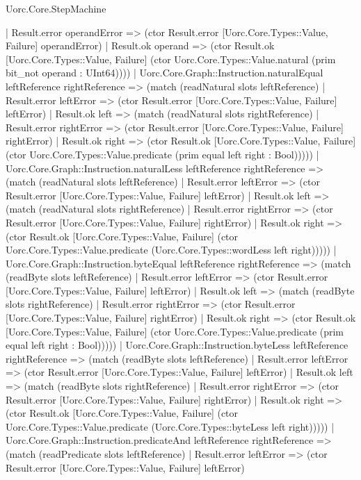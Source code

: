 \begin{lexlean}{Uorc.Core.StepMachine}
\begin{semanticmodule}
{      | Result.error operandError => (ctor Result.error [Uorc.Core.Types::Value, Failure] operandError)
      | Result.ok operand => (ctor Result.ok [Uorc.Core.Types::Value, Failure] (ctor Uorc.Core.Types::Value.natural (prim bit_not operand : UInt64))))
    | Uorc.Core.Graph::Instruction.naturalEqual leftReference rightReference => (match (readNatural slots leftReference)
      | Result.error leftError => (ctor Result.error [Uorc.Core.Types::Value, Failure] leftError)
      | Result.ok left => (match (readNatural slots rightReference)
        | Result.error rightError => (ctor Result.error [Uorc.Core.Types::Value, Failure] rightError)
        | Result.ok right => (ctor Result.ok [Uorc.Core.Types::Value, Failure] (ctor Uorc.Core.Types::Value.predicate (prim equal left right : Bool)))))
    | Uorc.Core.Graph::Instruction.naturalLess leftReference rightReference => (match (readNatural slots leftReference)
      | Result.error leftError => (ctor Result.error [Uorc.Core.Types::Value, Failure] leftError)
      | Result.ok left => (match (readNatural slots rightReference)
        | Result.error rightError => (ctor Result.error [Uorc.Core.Types::Value, Failure] rightError)
        | Result.ok right => (ctor Result.ok [Uorc.Core.Types::Value, Failure] (ctor Uorc.Core.Types::Value.predicate (Uorc.Core.Types::wordLess left right)))))
    | Uorc.Core.Graph::Instruction.byteEqual leftReference rightReference => (match (readByte slots leftReference)
      | Result.error leftError => (ctor Result.error [Uorc.Core.Types::Value, Failure] leftError)
      | Result.ok left => (match (readByte slots rightReference)
        | Result.error rightError => (ctor Result.error [Uorc.Core.Types::Value, Failure] rightError)
        | Result.ok right => (ctor Result.ok [Uorc.Core.Types::Value, Failure] (ctor Uorc.Core.Types::Value.predicate (prim equal left right : Bool)))))
    | Uorc.Core.Graph::Instruction.byteLess leftReference rightReference => (match (readByte slots leftReference)
      | Result.error leftError => (ctor Result.error [Uorc.Core.Types::Value, Failure] leftError)
      | Result.ok left => (match (readByte slots rightReference)
        | Result.error rightError => (ctor Result.error [Uorc.Core.Types::Value, Failure] rightError)
        | Result.ok right => (ctor Result.ok [Uorc.Core.Types::Value, Failure] (ctor Uorc.Core.Types::Value.predicate (Uorc.Core.Types::byteLess left right)))))
    | Uorc.Core.Graph::Instruction.predicateAnd leftReference rightReference => (match (readPredicate slots leftReference)
      | Result.error leftError => (ctor Result.error [Uorc.Core.Types::Value, Failure] leftError)
}
\end{semanticmodule}
\end{lexlean}
